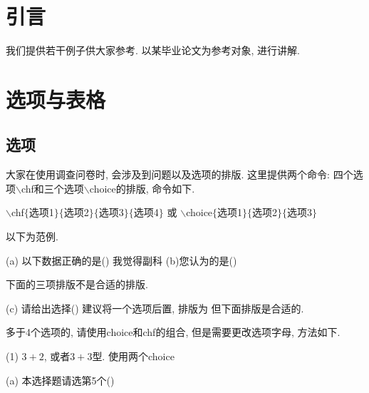 \documentclass[a4paper,12pt,twoside]{ctexart}
\begin{document}
\newpage %
\pagestyle{empty}
\tableofcontents      %
\newpage %

\newpage


\section{引言}
    我们提供若干例子供大家参考. 以某毕业论文为参考对象, 进行讲解.

\section{选项与表格}
    \subsection{选项}
    大家在使用调查问卷时, 会涉及到问题以及选项的排版. 这里提供两个命令: 四个选项$\backslash$chf和三个选项$\backslash$choice的排版, 命令如下.

    $\backslash$chf$\{$选项1$\}\{$选项2$\}\{$选项3$\}\{$选项4$\}$ \quad 或 \quad
    $\backslash$choice$\{$选项1$\}\{$选项2$\}\{$选项3$\}$

    以下为范例.

    \noindent(a) 以下数据正确的是\hfill(\qquad)
    {我觉得副科}
    \noindent(b)您认为的是\hfill(\qquad)

   下面的三项排版不是合适的排版.

   \noindent (c) 请给出选择\hfill(\qquad)
   建议将一个选项后置, 排版为
   但下面排版是合适的.

    \vspace*{-15pt}多于4个选项的, 请使用choice和chf的组合, 但是需要更改选项字母, 方法如下.

    (1) $3+2$, 或者$3+3$型. 使用两个choice

    \noindent(a) 本选择题请选第5个\hfill (\qquad)
    \def\mychA{D}\def\mychB{E}\def\mychC{F}
    \def\mychA{A}\def\mychB{B}\def\mychC{C}
\end{document}
